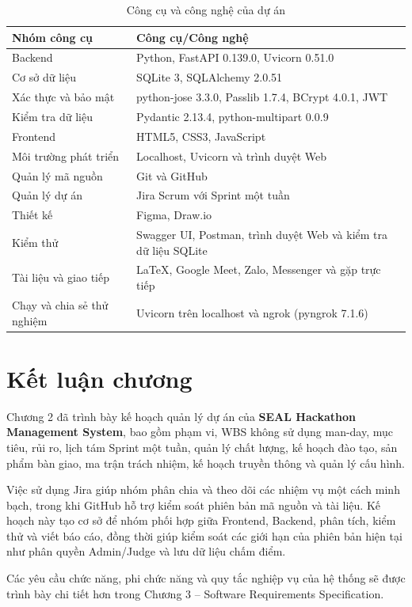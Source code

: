 \begin{table}[H]
    \centering
    \caption{Công cụ và công nghệ của dự án}
    \label{tab:tools-infrastructure}
    \renewcommand{\arraystretch}{1.3}
    \begin{tabularx}{\textwidth}{|p{4.0cm}|Y|}
        \hline
        \textbf{Nhóm công cụ} & \textbf{Công cụ/Công nghệ} \\
        \hline
        Backend & Python, FastAPI 0.139.0, Uvicorn 0.51.0 \\
        \hline
        Cơ sở dữ liệu & SQLite 3, SQLAlchemy 2.0.51 \\
        \hline
        Xác thực và bảo mật & python-jose 3.3.0, Passlib 1.7.4, BCrypt 4.0.1, JWT \\
        \hline
        Kiểm tra dữ liệu & Pydantic 2.13.4, python-multipart 0.0.9 \\
        \hline
        Frontend & HTML5, CSS3, JavaScript \\
        \hline
        Môi trường phát triển & Localhost, Uvicorn và trình duyệt Web \\
        \hline
        Quản lý mã nguồn & Git và GitHub \\
        \hline
        Quản lý dự án & Jira Scrum với Sprint một tuần \\
        \hline
        Thiết kế & Figma, Draw.io \\
        \hline
        Kiểm thử & Swagger UI, Postman, trình duyệt Web và kiểm tra dữ liệu SQLite \\
        \hline
        Tài liệu và giao tiếp & LaTeX, Google Meet, Zalo, Messenger và gặp trực tiếp \\
        \hline
        Chạy và chia sẻ thử nghiệm & Uvicorn trên localhost và ngrok (pyngrok 7.1.6) \\
        \hline
    \end{tabularx}
\end{table}

\section{Kết luận chương}

Chương 2 đã trình bày kế hoạch quản lý dự án của \textbf{SEAL Hackathon Management System}, bao gồm phạm vi, WBS không sử dụng man-day, mục tiêu, rủi ro, lịch tám Sprint một tuần, quản lý chất lượng, kế hoạch đào tạo, sản phẩm bàn giao, ma trận trách nhiệm, kế hoạch truyền thông và quản lý cấu hình.

Việc sử dụng Jira giúp nhóm phân chia và theo dõi các nhiệm vụ một cách minh bạch, trong khi GitHub hỗ trợ kiểm soát phiên bản mã nguồn và tài liệu. Kế hoạch này tạo cơ sở để nhóm phối hợp giữa Frontend, Backend, phân tích, kiểm thử và viết báo cáo, đồng thời giúp kiểm soát các giới hạn của phiên bản hiện tại như phân quyền Admin/Judge và lưu dữ liệu chấm điểm.

Các yêu cầu chức năng, phi chức năng và quy tắc nghiệp vụ của hệ thống sẽ được trình bày chi tiết hơn trong Chương 3 -- Software Requirements Specification.
